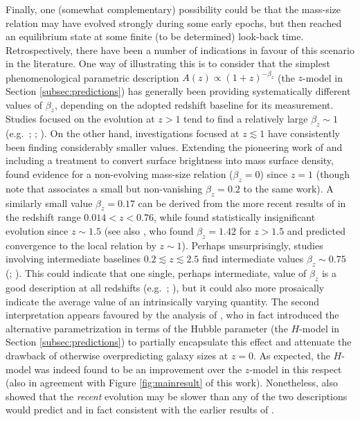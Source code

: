 \documentclass[fleqn,usenatbib]{mnras}
\begin{document}
Finally, one (somewhat complementary) possibility could be that the mass-size relation may have evolved strongly during some early epochs, but then reached an equilibrium state at some finite (to be determined) look-back time. Retrospectively, there have been a number of indications in favour of this scenario in the literature. One way of illustrating this is to consider that the simplest phenomenological parametric description $A(z) \propto (1+z)^{-\beta_z}$ (the $z$-model in Section \ref{subsec:predictions}) has generally been providing systematically different values of $\beta_z$, depending on the adopted redshift baseline for its measurement. Studies focused on the evolution at $z > 1$ tend to find a relatively large $\beta_z \sim 1$ (e.g.\ \citealt{Oesch+10}; \citealt{Allen+17}; \citealt{Yang+21}). On the other hand, investigations focused at $z \lesssim 1$ have consistently been finding considerably smaller values. Extending the pioneering work of \cite{Lilly+98} and including a treatment to convert surface brightness into mass surface density, 
\cite{Barden+05} found evidence for a non-evolving mass-size relation ($\beta_z = 0$) since $z =1$ (though note that \citealt{vdW+14} associates a small but non-vanishing $\beta_z = 0.2$ to the same work). A similarly small value $\beta_z = 0.17$ can be derived from the more recent results of \cite{Barone+21} in the redshift range $0.014< z < 0.76$, while \cite{Nadolny+21} found statistically insignificant evolution since $z \sim 1.5$ (see also \citealt{Nagy+11}, who found $\beta_z = 1.42$ for $z > 1.5$ and predicted convergence to the local relation by $z \sim 1$). Perhaps unsurprisingly, studies involving intermediate baselines $0.2 \lesssim z \lesssim 2.5$ find intermediate values $\beta_z \sim 0.75$ (\citealt{vdW+14}; \citealt{Paulino-Afonso+17}). This could indicate that one single, perhaps intermediate, value of $\beta_z$ is a good description at all redshifts (e.g.\ \citealt{LillyCarollo2016}; \citealt{Renzini2020}), but it could also more prosaically indicate the average value of an intrinsically varying quantity. The second interpretation appears favoured by the analysis of \cite{vdW+14}, who in fact introduced the alternative parametrization in terms of the Hubble parameter (the $H$-model in Section \ref{subsec:predictions}) to partially encapsulate this effect and attenuate the drawback of otherwise overpredicting galaxy sizes at $z = 0$.  As expected, the $H$-model was indeed found to be an improvement over the $z$-model in this respect (also in agreement with Figure \ref{fig:mainresult} of this work). Nonetheless, \cite{vdW+14} also showed that the \emph{recent} evolution may be slower than any of the two descriptions would predict and in fact consistent with the earlier results of \cite{Barden+05}.
\end{document}
